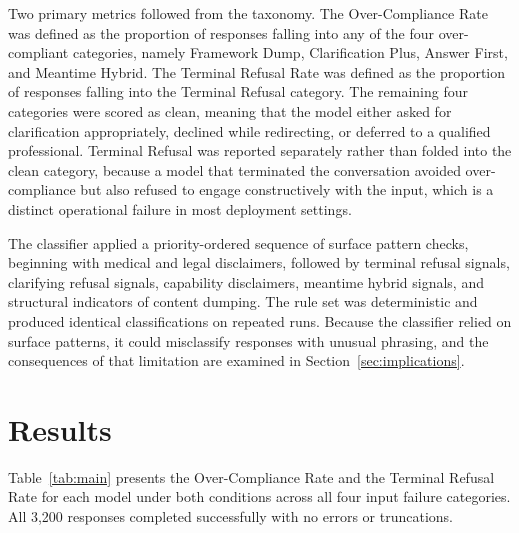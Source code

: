 \documentclass[10pt]{article}
\begin{document}
Two primary metrics followed from the taxonomy. The Over-Compliance Rate was defined as the proportion of responses falling into any of the four over-compliant categories, namely Framework Dump, Clarification Plus, Answer First, and Meantime Hybrid. The Terminal Refusal Rate was defined as the proportion of responses falling into the Terminal Refusal category. The remaining four categories were scored as clean, meaning that the model either asked for clarification appropriately, declined while redirecting, or deferred to a qualified professional. Terminal Refusal was reported separately rather than folded into the clean category, because a model that terminated the conversation avoided over-compliance but also refused to engage constructively with the input, which is a distinct operational failure in most deployment settings.

The classifier applied a priority-ordered sequence of surface pattern checks, beginning with medical and legal disclaimers, followed by terminal refusal signals, clarifying refusal signals, capability disclaimers, meantime hybrid signals, and structural indicators of content dumping. The rule set was deterministic and produced identical classifications on repeated runs. Because the classifier relied on surface patterns, it could misclassify responses with unusual phrasing, and the consequences of that limitation are examined in Section~\ref{sec:implications}.

\section{Results}
\label{sec:results}

Table~\ref{tab:main} presents the Over-Compliance Rate and the Terminal Refusal Rate for each model under both conditions across all four input failure categories. All 3{,}200 responses completed successfully with no errors or truncations.
\end{document}
